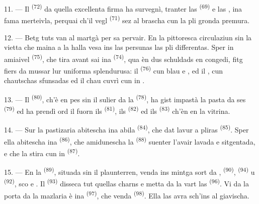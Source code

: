 11. --- Il  \textsuperscript{(72)} da quella excellenta firma ha survegnì,
tranter las  \textsuperscript{(69)} e las , ina fama
merteivla, perquai ch'il vegl  \textsuperscript{(71)} sez al brascha cun la
pli
gronda premura.

\VUsaut{4.0mm}
\VUsaut{3.0mm}

12. --- Betg tuts van al martgà per sa pervair. En la pittoresca circulaziun sin la
vietta che maina a la halla vesa ins las persunas las pli differentas. Sper in
amiaivel  \textsuperscript{(75)}, che tira avant sai ina
 \textsuperscript{(74)}, qua èn dus schuldads en congedi, fitg fiers da
mussar lur uniforma splendurusa: il  \textsuperscript{(76)} cun blau
 e , ed il , cun
chautschas sfunsadas ed il chau cuvrì cun in .

13. --- Il  \textsuperscript{(80)}, ch'è en pes sin il sulier da la
 \textsuperscript{(78)}, ha gist impastà la pasta da ses 
\textsuperscript{(79)} ed ha prendì ord il fuorn ils  \textsuperscript{(81)}, ils
 \textsuperscript{(82)} ed ils  \textsuperscript{(83)} ch'èn
en la
vitrina.

14. --- Sur la pastizaria abitescha ina abila  \textsuperscript{(84)}, che
dat lavur a pliras  \textsuperscript{(85)}. Sper ella abitescha ina
 \textsuperscript{(86)}, che amidunescha la 
\textsuperscript{(88)} suenter l'avair lavada e sitgentada, e che la stira cun in
 \textsuperscript{(87)}.

\VUsaut{4.0mm}
\VUsaut{3.0mm}

15. --- En la  \textsuperscript{(89)}, situada sin il plaunterren, venda ins
mintga sort da ,  \textsuperscript{(90)},  \textsuperscript{(94)} u  \textsuperscript{(92)}, sco
 e . Il 
\textsuperscript{(93)} disseca tut quellas charns e metta da la vart las  \textsuperscript{(96)}. Vi da la porta da la mazlaria è ina 
\textsuperscript{(97)}, che venda  \textsuperscript{(98)}. Ella las avra sch'ins
al giavischa.

